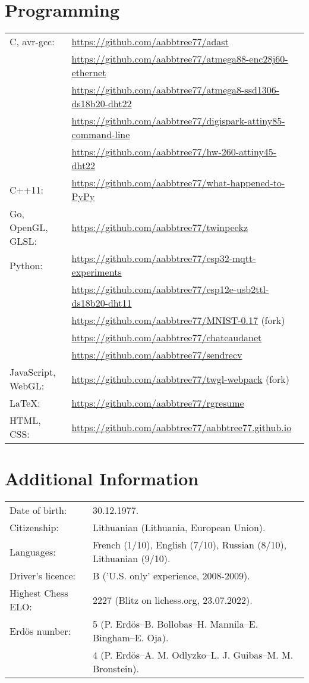 \documentclass[a4paper,11pt]{article}
\begin{document}
\section{Programming}
\begin{tabular}{ll}
C, avr-gcc: & \url{https://github.com/aabbtree77/adast}\\
& \url{https://github.com/aabbtree77/atmega88-enc28j60-ethernet}\\
& \url{https://github.com/aabbtree77/atmega8-ssd1306-ds18b20-dht22}\\
& \url{https://github.com/aabbtree77/digispark-attiny85-command-line}\\
& \url{https://github.com/aabbtree77/hw-260-attiny45-dht22}\\
C++11: & \url{https://github.com/aabbtree77/what-happened-to-PyPy}\\
Go, OpenGL, GLSL: & \url{https://github.com/aabbtree77/twinpeekz}\\
Python: & \url{https://github.com/aabbtree77/esp32-mqtt-experiments}\\
& \url{https://github.com/aabbtree77/esp12e-usb2ttl-ds18b20-dht11}\\
& \url{https://github.com/aabbtree77/MNIST-0.17} (fork)\\
& \url{https://github.com/aabbtree77/chateaudanet}\\
& \url{https://github.com/aabbtree77/sendrecv}\\
JavaScript, WebGL: & \url{https://github.com/aabbtree77/twgl-webpack} (fork)\\
LaTeX: & \url{https://github.com/aabbtree77/rgresume}\\
HTML, CSS: & \url{https://github.com/aabbtree77/aabbtree77.github.io}
\end{tabular}
%
\section{Additional Information}
%
\begin{tabular}{ll}
		Date of birth: & 30.12.1977.\\
		Citizenship: & Lithuanian (Lithuania, European Union).\\
        Languages: & French (1/10), English (7/10), Russian (8/10), Lithuanian (9/10).\\
        Driver's licence:& B ('U.S. only' experience, 2008-2009).\\
        Highest Chess ELO:& 2227 (Blitz on lichess.org, 23.07.2022).\\
        Erd\"{o}s number: & 5 (P. Erd\"{o}s--B. Bollobas--H. Mannila--E. Bingham--E. Oja).\\
                          & 4 (P. Erd\"{o}s--A. M. Odlyzko--L. J. Guibas--M. M. Bronstein).
\end{tabular}
%

\end{document}

